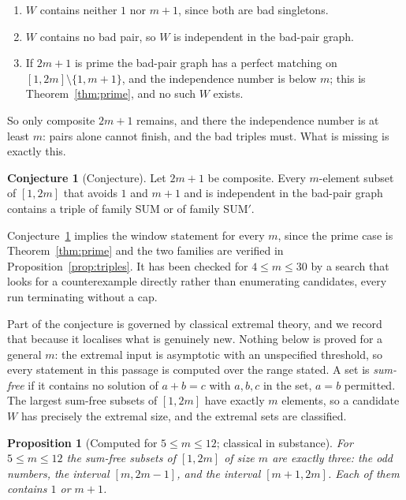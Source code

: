 \documentclass[11pt]{amsart}
\theoremstyle{plain}
\newtheorem{proposition}[theorem]{Proposition}
\theoremstyle{definition}
\newtheorem{conjecture}[theorem]{Conjecture}
\begin{document}
\begin{enumerate}
\item $W$ contains neither $1$ nor $m+1$, since both are bad singletons.
\item $W$ contains no bad pair, so $W$ is independent in the bad-pair graph.
\item If $2m+1$ is prime the bad-pair graph has a perfect matching on
  $[1,2m] \setminus \{1,m+1\}$, and the independence number is below $m$; this is
  Theorem~\ref{thm:prime}, and no such $W$ exists.
\end{enumerate}

So only composite $2m+1$ remains, and there the independence number is at least $m$: pairs alone
cannot finish, and the bad triples must. What is missing is exactly this.

\begin{conjecture}[Conjecture]\label{conj:link}
Let $2m+1$ be composite. Every $m$-element subset of $[1,2m]$ that avoids $1$ and $m+1$ and is
independent in the bad-pair graph contains a triple of family SUM or of family SUM$'$.
\end{conjecture}

Conjecture~\ref{conj:link} implies the window statement for every $m$, since the prime case is
Theorem~\ref{thm:prime} and the two families are verified in
Proposition~\ref{prop:triples}. It has been checked for $4 \le m \le 30$ by a search that looks for
a counterexample directly rather than enumerating candidates, every run terminating without a cap.

Part of the conjecture is governed by classical extremal theory, and we record that because it
localises what is genuinely new. Nothing below is proved for a general $m$: the extremal input is
asymptotic with an unspecified threshold, so every statement in this passage is computed over the
range stated. A set is \emph{sum-free} if it contains no solution of $a+b=c$ with
$a,b,c$ in the set, $a=b$ permitted. The largest sum-free subsets of $[1,2m]$ have exactly $m$
elements, so a candidate $W$ has precisely the extremal size, and the extremal sets are classified.

\begin{proposition}[Computed for $5\le m\le12$; classical in substance]\label{prop:sf}
For $5\le m\le12$ the sum-free subsets of $[1,2m]$ of size $m$ are exactly three: the odd numbers,
the interval $[m,2m-1]$, and the interval $[m+1,2m]$. Each of them contains $1$ or $m+1$.
\end{proposition}
\end{document}
